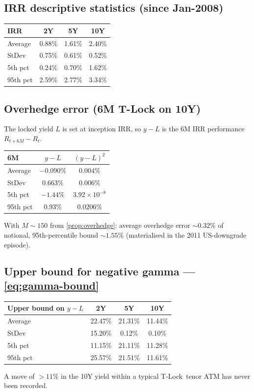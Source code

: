\documentclass[11pt]{article}
\theoremstyle{definition}
\newcommand{\Tlock}{T-Lock}
\newcommand{\IRR}{\ensuremath{\mathrm{IRR}}}
\begin{document}
\subsection{IRR descriptive statistics (since Jan-2008)}
\begin{center}\small
\begin{tabular}{lccc}
\toprule
\textbf{IRR} & \textbf{2Y} & \textbf{5Y} & \textbf{10Y}\\
\midrule
Average & 0.88\% & 1.61\% & 2.40\%\\
StDev & 0.75\% & 0.61\% & 0.52\%\\
5th pct & 0.24\% & 0.70\% & 1.62\%\\
95th pct & 2.59\% & 2.77\% & 3.34\%\\
\bottomrule
\end{tabular}
\end{center}

\subsection{Overhedge error (6M T-Lock on 10Y)}
The locked yield $L$ is set at inception $\IRR$, so $y-L$ is the 6M
$\IRR$ performance $R_{t+6M} - R_t$.
\begin{center}\small
\begin{tabular}{lcc}
\toprule
\textbf{6M} & $y - L$ & $(y-L)^2$\\
\midrule
Average & $-0.090\%$ & $0.004\%$\\
StDev & $0.663\%$ & $0.006\%$\\
5th pct & $-1.44\%$ & $3.92\!\times\!10^{-8}$\\
95th pct & $0.93\%$ & $0.0206\%$\\
\bottomrule
\end{tabular}
\end{center}
With $M\sim 150$ from \cref{prop:overhedge}: average overhedge error
$\sim 0.32\%$ of notional, 95th-percentile bound $\sim 1.55\%$
(materialised in the 2011 US-downgrade episode).

\subsection{Upper bound for negative gamma --- \cref{eq:gamma-bound}}
\begin{center}\small
\begin{tabular}{lccc}
\toprule
\textbf{Upper bound on $y - L$} & \textbf{2Y} & \textbf{5Y} & \textbf{10Y}\\
\midrule
Average & 22.47\% & 21.31\% & 11.44\%\\
StDev & 15.20\% & 0.12\% & 0.10\%\\
5th pct & 11.15\% & 21.11\% & 11.28\%\\
95th pct & 25.57\% & 21.51\% & 11.61\%\\
\bottomrule
\end{tabular}
\end{center}
A move of $> 11\%$ in the 10Y yield within a typical \Tlock\ tenor
ATM has never been recorded.
\end{document}
